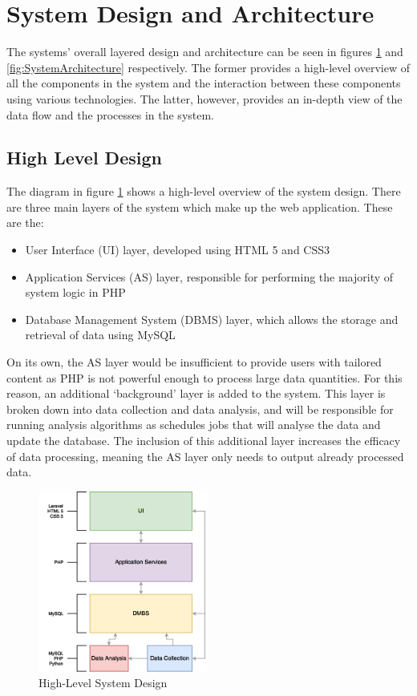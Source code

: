 \section{System Design and Architecture}
The systems' overall layered design and architecture can be seen in figures \ref{fig:LayerArchitecture} and \ref{fig:SystemArchitecture} respectively. The former provides a high-level overview of all the components in the system and the interaction between these components using various technologies. The latter, however, provides an in-depth view of the data flow and the processes in the system.

\subsection{High Level Design}
The diagram in figure \ref{fig:LayerArchitecture} shows a high-level overview of the system design. There are three main layers of the system which make up the web application. These are the:

\begin{itemize}
\item User Interface (UI) layer, developed using HTML 5 and CSS3
\item Application Services (AS) layer, responsible for performing the majority of system logic in PHP
\item Database Management System (DBMS) layer, which allows the storage and retrieval of data using MySQL
\end{itemize}

On its own, the AS layer would be insufficient to provide users with tailored content as PHP is not powerful enough to process large data quantities. For this reason, an additional `background' layer is added to the system. This layer is broken down into data collection and data analysis, and will be responsible for running analysis algorithms as schedules jobs that will analyse the data and update the database. The inclusion of this additional layer increases the efficacy of data processing, meaning the AS layer only needs to output already processed data.

\begin{figure}[H]
  \centering
  \includegraphics[width=0.5\textwidth]{Images/Design/LayerArchitecture}
  \caption{High-Level System Design} \label{fig:LayerArchitecture} 
\end{figure}

